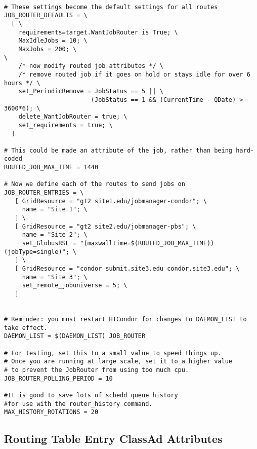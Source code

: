 \footnotesize
\begin{verbatim}

# These settings become the default settings for all routes
JOB_ROUTER_DEFAULTS = \
  [ \
    requirements=target.WantJobRouter is True; \
    MaxIdleJobs = 10; \
    MaxJobs = 200; \
\
    /* now modify routed job attributes */ \
    /* remove routed job if it goes on hold or stays idle for over 6 hours */ \
    set_PeriodicRemove = JobStatus == 5 || \
                        (JobStatus == 1 && (CurrentTime - QDate) > 3600*6); \
    delete_WantJobRouter = true; \
    set_requirements = true; \
  ]

# This could be made an attribute of the job, rather than being hard-coded
ROUTED_JOB_MAX_TIME = 1440

# Now we define each of the routes to send jobs on
JOB_ROUTER_ENTRIES = \
   [ GridResource = "gt2 site1.edu/jobmanager-condor"; \
     name = "Site 1"; \
   ] \
   [ GridResource = "gt2 site2.edu/jobmanager-pbs"; \
     name = "Site 2"; \
     set_GlobusRSL = "(maxwalltime=$(ROUTED_JOB_MAX_TIME))(jobType=single)"; \
   ] \
   [ GridResource = "condor submit.site3.edu condor.site3.edu"; \
     name = "Site 3"; \
     set_remote_jobuniverse = 5; \
   ]


# Reminder: you must restart HTCondor for changes to DAEMON_LIST to take effect.
DAEMON_LIST = $(DAEMON_LIST) JOB_ROUTER

# For testing, set this to a small value to speed things up.
# Once you are running at large scale, set it to a higher value
# to prevent the JobRouter from using too much cpu.
JOB_ROUTER_POLLING_PERIOD = 10

#It is good to save lots of schedd queue history
#for use with the router_history command.
MAX_HISTORY_ROTATIONS = 20
\end{verbatim}
\normalsize



\subsection{\label{RoutingTableAttributes} Routing Table Entry ClassAd Attributes}

